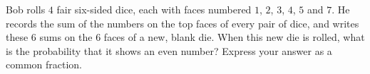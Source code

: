 Bob rolls $4$ fair six-sided dice, each with faces numbered $1$, $2$, $3$, $4$, $5$ and $7$. He records the sum of the numbers on the top faces of every pair of dice, and writes these $6$ sums on the $6$ faces of a new, blank die. When this new die is rolled, what is the probability that it shows an even number? Express your answer as a common fraction.
